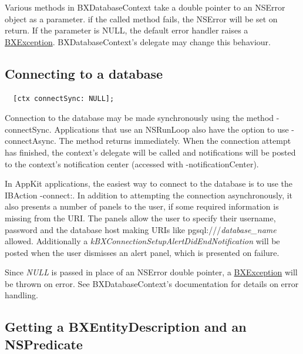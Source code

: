 Various methods in B\+X\+Database\+Context take a double pointer to an N\+S\+Error object as a parameter. if the called method fails, the N\+S\+Error will be set on return. If the parameter is N\+U\+L\+L, the default error handler raises a \hyperlink{interface_b_x_exception}{B\+X\+Exception}. B\+X\+Database\+Context's delegate may change this behaviour.\hypertarget{getting_started_connecting_to_a_database}{}\subsection{Connecting to a database}\label{getting_started_connecting_to_a_database}
 
  \begin{lstlisting}
  [ctx connectSync: NULL];
  \end{lstlisting}
   

Connection to the database may be made synchronously using the method -\/connect\+Sync. Applications that use an N\+S\+Run\+Loop also have the option to use -\/connect\+Async. The method returns immediately. When the connection attempt has finished, the context's delegate will be called and notifications will be posted to the context's notification center (accessed with -\/notification\+Center).

In App\+Kit applications, the easiest way to connect to the database is to use the I\+B\+Action -\/connect\+:. In addition to attempting the connection asynchronously, it also presents a number of panels to the user, if some required information is missing from the U\+R\+I. The panels allow the user to specify their username, password and the database host making U\+R\+Is like {\ttfamily pgsql\+:///{\itshape database\+\_\+name}} allowed. Additionally a {\itshape k\+B\+X\+Connection\+Setup\+Alert\+Did\+End\+Notification} will be posted when the user dismisses an alert panel, which is presented on failure.

Since {\itshape N\+U\+L\+L} is passed in place of an N\+S\+Error double pointer, a \hyperlink{interface_b_x_exception}{B\+X\+Exception} will be thrown on error. See B\+X\+Database\+Context's documentation for details on error handling.\hypertarget{getting_started_getting_an_entity_and_a_predicate}{}\subsection{Getting a B\+X\+Entity\+Description and an N\+S\+Predicate}\label{getting_started_getting_an_entity_and_a_predicate}
 
